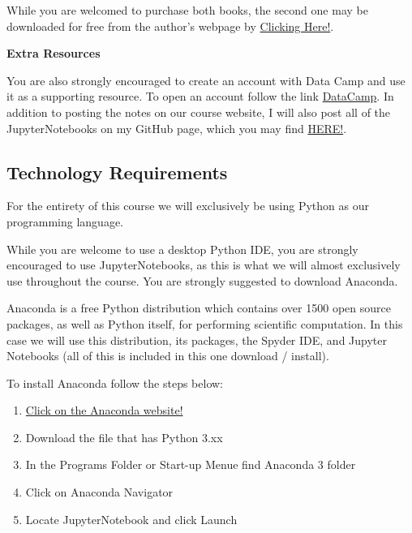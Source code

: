\documentclass[11pt]{article}
\theoremstyle{plain}
\theoremstyle{definition}
\begin{document}
While you are welcomed to purchase both books, the second one may be downloaded for free from the author's webpage by  \href{http://faculty.marshall.usc.edu/gareth-james/ISL/}{Clicking Here!}.
\vskip 12pt

{\bf Extra Resources}

You are also strongly encouraged to create an account with Data Camp and use it as a supporting resource. To open an account follow the link \href{https://www.datacamp.com/}{DataCamp}. In addition to posting the notes on our course website, I will also post all of the JupyterNotebooks on my GitHub page, which you may find  \href{https://github.com/vbucaj/lecture-notes}{HERE!}.


\subsection{Technology Requirements}

For the entirety of this course we will exclusively be using Python as our programming language. 

\vskip 8pt

While you are welcome to use a desktop Python IDE, you are strongly encouraged to use JupyterNotebooks, as this is what we will almost exclusively use throughout the course. You are strongly suggested to download Anaconda. 

\vskip 8pt

Anaconda is a free Python distribution which contains over 1500 open source packages, as well as Python itself, for performing scientific computation. In this case we will use this distribution, its packages, the Spyder IDE, and Jupyter Notebooks (all of this is included in this one download / install). 

\vskip 8pt

To install Anaconda follow the steps below:

\begin{enumerate}[(1)]
\item \href{https://www.anaconda.com/distribution/}{Click on the Anaconda website!}
\item Download the file that has Python $3$.xx
\item In the Programs Folder or Start-up Menue find Anaconda 3 folder
\item Click on Anaconda Navigator
\item Locate JupyterNotebook and click Launch
\end{enumerate}
\end{document}
